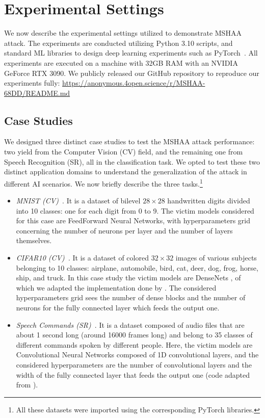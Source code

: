 \section{Experimental Settings}
We now describe the experimental settings utilized to demonstrate MSHAA attack. 
The experiments are conducted utilizing Python 3.10 scripts, and standard ML libraries to design deep learning experiments such as PyTorch~\cite{paszke2019pytorch}. 
All experiments are executed on a machine with 32GB RAM with an NVIDIA GeForce RTX 3090.
We publicly released our GitHub repository to reproduce our experiments fully: 
\url{https://anonymous.4open.science/r/MSHAA-68DD/README.md}

\subsection{Case Studies}
We designed three distinct case studies to test the MSHAA attack performance: two yield from the Computer Vision (CV) field, and the remaining one from Speech Recognition (SR), all in the classification task.
We opted to test these two distinct application domains %
to understand the generalization of the attack in different AI scenarios. 
We now briefly describe the three tasks.\footnote{All these datasets were imported using the corresponding PyTorch libraries.} 
\begin{itemize}
    \item \textit{MNIST (CV)~\cite{lecun2010mnist}}. It is a dataset of bilevel $28 \times 28$ handwritten digits divided into 10 classes: one for each digit from 0 to 9. The victim models considered for this case are FeedForward Neural Networks, with hyperparameters grid concerning the number of neurons per layer and the number of layers themselves. 
    \item \textit{CIFAR10 (CV)~\cite{cifar10}}. It is a dataset of colored $32 \times 32$ images of various subjects belonging to 10 classes: airplane, automobile, bird, cat, deer, dog, frog, horse, ship, and truck. In this case study the victim models are DenseNets \cite{huang2017densely}, of which we adapted the implementation done by \cite{PyTorchDenseNet}. The considered hyperparameters grid sees the number of dense blocks and the number of neurons for the fully connected layer which feeds the output one.
    \item \textit{Speech Commands (SR)~\cite{speechcommandsdataset}}. It is a dataset composed of audio files that are about 1 second long (around 16000 frames long) and belong to 35 classes of different commands spoken by different people. Here, the victim models are Convolutional Neural Networks composed of 1D convolutional layers, and the considered hyperparameters are the number of convolutional layers and the width of the fully connected layer that feeds the output one (code adapted from \cite{PyTorchSpeechCommands}).
\end{itemize}
